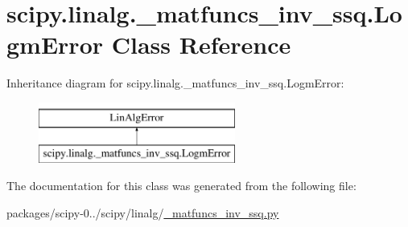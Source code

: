 \hypertarget{classscipy_1_1linalg_1_1__matfuncs__inv__ssq_1_1LogmError}{}\section{scipy.\+linalg.\+\_\+matfuncs\+\_\+inv\+\_\+ssq.\+Logm\+Error Class Reference}
\label{classscipy_1_1linalg_1_1__matfuncs__inv__ssq_1_1LogmError}
Inheritance diagram for scipy.\+linalg.\+\_\+matfuncs\+\_\+inv\+\_\+ssq.\+Logm\+Error\+:\begin{figure}[H]
\begin{center}
\leavevmode
\includegraphics[height=2.000000cm]{classscipy_1_1linalg_1_1__matfuncs__inv__ssq_1_1LogmError}
\end{center}
\end{figure}


The documentation for this class was generated from the following file\+:\begin{DoxyCompactItemize}
\item 
packages/scipy-\/0../scipy/linalg/\hyperlink{__matfuncs__inv__ssq_8py}{\+\_\+matfuncs\+\_\+inv\+\_\+ssq.\+py}\end{DoxyCompactItemize}
